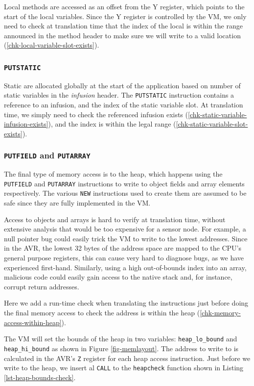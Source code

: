 Local methods are accessed as an offset from the Y register, which points to the start of the local variables. Since the Y register is controlled by the VM, we only need to check at translation time that the index of the local is within the range announced in the method header to make sure we will write to a valid location (\ref{chk-local-variable-slot-exists}).

\subsubsection{\texttt{PUTSTATIC}}
Static are allocated globally at the start of the application based on number of static variables in the \emph{infusion} header. The \texttt{PUTSTATIC} instruction contains a reference to an infusion, and the index of the static variable slot. At translation time, we simply need to check the referenced infusion exists (\ref{chk-static-variable-infusion-exists}), and the index is within the legal range (\ref{chk-static-variable-slot-exists}).

\subsubsection{\texttt{PUTFIELD} and \texttt{PUTARRAY}}
The final type of memory access is to the heap, which happens using the \texttt{PUTFIELD} and \texttt{PUTARRAY} instructions to write to object fields and array elements respectively. The various \texttt{NEW} instructions used to create them are assumed to be safe since they are fully implemented in the VM.

Access to objects and arrays is hard to verify at translation time, without extensive analysis that would be too expensive for a sensor node. For example, a null pointer bug could easily trick the VM to write to the lowest addresses. Since in the AVR, the lowest 32 bytes of the address space are mapped to the CPU's general purpose registers, this can cause very hard to diagnose bugs, as we have experienced first-hand. Similarly, using a high out-of-bounds index into an array, malicious code could easily gain access to the native stack and, for instance, corrupt return addresses.

Here we add a run-time check when translating the instructions just before doing the final memory access to check the address is within the heap (\ref{chk-memory-access-within-heap}).

The VM will set the bounds of the heap in two variables: \texttt{heap\_lo\_bound} and \texttt{heap\_hi\_bound} as shown in Figure \ref{fig-memlayout}. The address to write to is calculated in the AVR's \texttt{Z} register for each heap access instruction. Just before we write to the heap, we insert al \texttt{CALL} to the \texttt{heapcheck} function shown in Listing \ref{lst-heap-bounds-check}.

